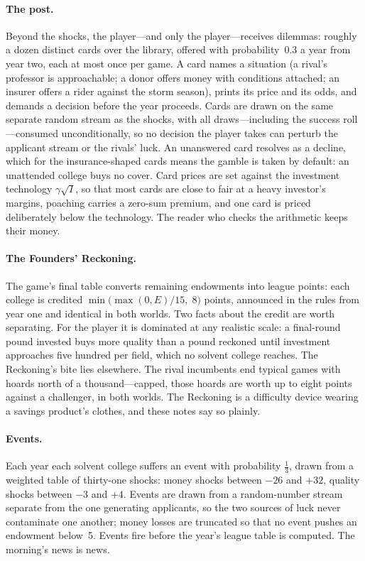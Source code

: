 \documentclass[11pt,a4paper]{article}
\begin{document}
\paragraph{The post.} Beyond the shocks, the player---and only the player---receives dilemmas: roughly a dozen distinct cards over the library, offered with probability~0.3 a year from year two, each at most once per game. A card names a situation (a rival's professor is approachable; a donor offers money with conditions attached; an insurer offers a rider against the storm season), prints its price and its odds, and demands a decision before the year proceeds. Cards are drawn on the same separate random stream as the shocks, with all draws---including the success roll---consumed unconditionally, so no decision the player takes can perturb the applicant stream or the rivals' luck. An unanswered card resolves as a decline, which for the insurance-shaped cards means the gamble is taken by default: an unattended college buys no cover. Card prices are set against the investment technology $\gamma\sqrt{I}$, so that most cards are close to fair at a heavy investor's margins, poaching carries a zero-sum premium, and one card is priced deliberately below the technology. The reader who checks the arithmetic keeps their money.

\paragraph{The Founders' Reckoning.} The game's final table converts remaining endowments into league points: each college is credited $\min\!\big(\max(0, E)/15,\; 8\big)$ points, announced in the rules from year one and identical in both worlds. Two facts about the credit are worth separating. For the player it is dominated at any realistic scale: a final-round pound invested buys more quality than a pound reckoned until investment approaches five hundred per field, which no solvent college reaches. The Reckoning's bite lies elsewhere. The rival incumbents end typical games with hoards north of a thousand---capped, those hoards are worth up to eight points against a challenger, in both worlds. The Reckoning is a difficulty device wearing a savings product's clothes, and these notes say so plainly.

\paragraph{Events.} Each year each solvent college suffers an event with probability $\tfrac13$, drawn from a weighted table of thirty-one shocks: money shocks between $-26$ and $+32$, quality shocks between $-3$ and $+4$. Events are drawn from a random-number stream separate from the one generating applicants, so the two sources of luck never contaminate one another; money losses are truncated so that no event pushes an endowment below~5. Events fire before the year's league table is computed. The morning's news is news.
\end{document}
